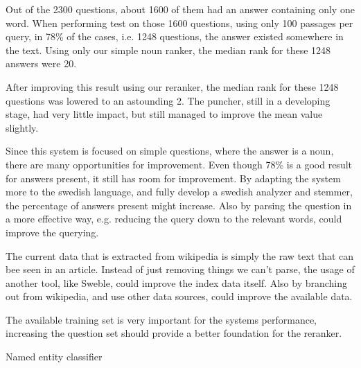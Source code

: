 Out of the 2300 questions, about 1600 of them had an answer containing only one word.
When performing test on those 1600 questions, using only 100 passages per query, 
in 78\% of the cases, i.e. 1248 questions, the answer existed somewhere in the text.
Using only our simple noun ranker, the median rank for these 1248 answers were 20.

After improving this result using our reranker, the median rank for these 1248 questions was lowered to an astounding 2.
The puncher, still in a developing stage, had very little impact, but still managed to improve the mean value slightly.

Since this system is focused on simple questions, where the answer is a noun, there are many opportunities for improvement.
Even though 78\% is a good result for answers present, it still has room for improvement. By adapting the system more to the swedish language, 
and fully develop a swedish analyzer and stemmer, the percentage of answers present might increase.
Also by parsing the question in a more effective way, e.g. reducing the query down to the relevant words, could improve the querying.

The current data that is extracted from wikipedia is simply the raw text that can bee seen in an article. 
Instead of just removing things we can't parse, the usage of another tool, like Sweble, could improve the index data itself.
Also by branching out from wikipedia, and use other data sources, could improve the available data.

The available training set is very important for the systems performance, increasing the question set should provide a better foundation for the reranker.

Named entity classifier



